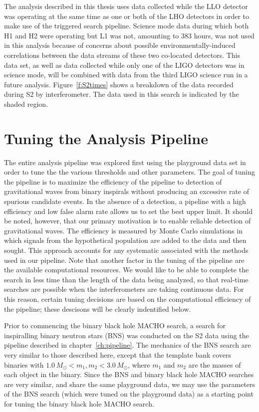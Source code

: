 The analysis described in this thesis uses data collected while the LLO
detector was operating at the same time as one or both of the LHO detectors in
order to make use of the triggered search pipeline.  Science mode data during
which both H1 and H2 were operating but L1 was not, amounting to 383 hours,
was not used in this analysis because of concerns about possible
environmentally-induced correlations between the data streams of these two
co-located detectors. This data set, as well as data collected while only one
of the LIGO detectors was in science mode, will be combined with data from the
third LIGO science run in a future analysis. Figure~\ref{f:S2times} shows a
breakdown of the data recorded during S2 by interferometer. The data used in
this search is indicated by the shaded region.

\section{Tuning the Analysis Pipeline}
\label{s:s2tuning}

The entire analysis pipeline was explored first using the playground data set
in order to tune the the various thresholds and other parameters. The goal of
tuning the pipeline is to maximize the efficiency of the pipeline to detection
of gravitational waves from binary inspirals without producing an excessive
rate of spurious candidate events. In the absence of a detection, a pipeline
with a high efficiency and low false alarm rate allows us to set the best
upper limit. It should be noted, however, that our primary motivation is to
enable reliable detection of gravitational waves. The efficiency is measured
by Monte Carlo simulations in which signals from the hypothetical population
are added to the data and then sought. This approach accounts for any
systematic associated with the methods used in our pipeline.  Note that
another factor in the tuning of the pipeline are the available computational
resources. We would like to be able to complete the search in less time than
the length of the data being analyzed, so that real-time searches are possible
when the interferometers are taking continuous data. For this reason, certain
tuning decisions are based on the computational efficiency of the pipeline;
these descisons will be clearly indentified below.

Prior to commencing the binary black hole MACHO search, a search for
inspiralling binary neutron stars (BNS) was conducted on the S2 data using the
pipeline described in chapter~\ref{ch:pipeline}\cite{LIGOS2iul}. The mechanics
of the BNS search are very similar to those described here, except that the
template bank covers binaries with $1.0\,M_\odot < m_1, m_2 < 3.0\,M_\odot$,
where $m_1$ and $m_2$ are the masses of each object in the binary. Since the
BNS and binary black hole MACHO searches are very similar, and share the same
playground data, we may use the parameters of the BNS search (which were tuned
on the playground data) as a starting point for tuning the binary black hole
MACHO search. 

